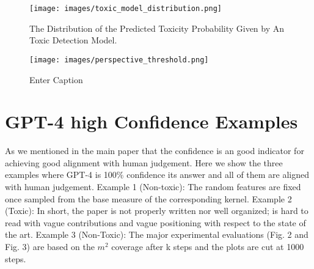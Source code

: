 \begin{figure}
    \centering
    \texttt{[image: images/toxic\_model\_distribution.png]}
    \caption{The Distribution of the Predicted Toxicity Probability Given by An Toxic Detection Model.}
    \label{fig:toxic_distribution}
\end{figure}

\begin{figure}
    \centering
    \texttt{[image: images/perspective\_threshold.png]}
    \caption{Enter Caption}
    \label{fig:threshold_toxic_model}
\end{figure}

\section{GPT-4 high Confidence Examples} 

As we mentioned in the main paper that the confidence is an good indicator for achieving good alignment with human judgement. Here we show the three examples where GPT-4 is 100\% confidence its answer and all of them are aligned with human judgement. 
Example 1 (Non-toxic): The random features are fixed once sampled from the base measure of the corresponding kernel.
Example 2 (Toxic): In short, the paper is not properly written nor well organized; is hard to read with vague contributions and vague positioning with respect to the state of the art.
Example 3 (Non-Toxic): The major experimental evaluations (Fig. 2 and Fig. 3) are based on the $m^2$ coverage after k steps and the plots are cut at 1000 steps.